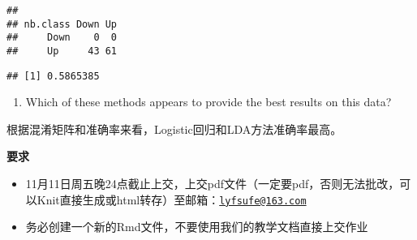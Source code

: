 \documentclass[
]{article}
\newenvironment{Shaded}{\begin{snugshade}}{\end{snugshade}}
\newcommand{\FunctionTok}[1]{\textcolor[rgb]{0.00,0.00,0.00}{#1}}
\newcommand{\NormalTok}[1]{#1}
\newcommand{\OtherTok}[1]{\textcolor[rgb]{0.56,0.35,0.01}{#1}}
\newcommand{\SpecialCharTok}[1]{\textcolor[rgb]{0.00,0.00,0.00}{#1}}
\providecommand{\tightlist}{%
  \setlength{\itemsep}{0pt}\setlength{\parskip}{0pt}}
\begin{document}
\begin{Shaded}
\end{Shaded}

\begin{verbatim}
##         
## nb.class Down Up
##     Down    0  0
##     Up     43 61
\end{verbatim}

\begin{Shaded}
\end{Shaded}

\begin{verbatim}
## [1] 0.5865385
\end{verbatim}

\begin{enumerate}
\def\labelenumi{\arabic{enumi}.}
\setcounter{enumi}{8}
\tightlist
\item
  Which of these methods appears to provide the best results on this
  data?
\end{enumerate}

根据混淆矩阵和准确率来看，Logistic回归和LDA方法准确率最高。

\textbf{要求}

\begin{itemize}
\tightlist
\item
  11月11日周五晚24点截止上交，上交pdf文件（一定要pdf，否则无法批改，可以Knit直接生成或html转存）至邮箱：\href{mailto:lyfsufe@163.com}{\nolinkurl{lyfsufe@163.com}}
\item
  务必创建一个新的Rmd文件，不要使用我们的教学文档直接上交作业
\end{itemize}
\end{document}
